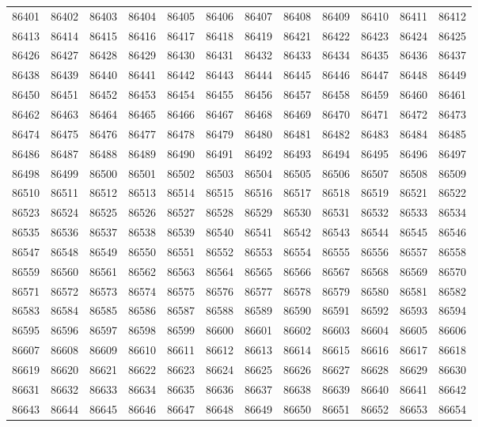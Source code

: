 \begin{center}
\begin{longtable}{llllllllllll}
86401 &86402 &86403 &86404 &86405 &86406 &86407 &86408 &86409 &86410 &86411 &86412 \\
86413 &86414 &86415 &86416 &86417 &86418 &86419 &86421 &86422 &86423 &86424 &86425 \\
86426 &86427 &86428 &86429 &86430 &86431 &86432 &86433 &86434 &86435 &86436 &86437 \\
86438 &86439 &86440 &86441 &86442 &86443 &86444 &86445 &86446 &86447 &86448 &86449 \\
86450 &86451 &86452 &86453 &86454 &86455 &86456 &86457 &86458 &86459 &86460 &86461 \\
86462 &86463 &86464 &86465 &86466 &86467 &86468 &86469 &86470 &86471 &86472 &86473 \\
86474 &86475 &86476 &86477 &86478 &86479 &86480 &86481 &86482 &86483 &86484 &86485 \\
86486 &86487 &86488 &86489 &86490 &86491 &86492 &86493 &86494 &86495 &86496 &86497 \\
86498 &86499 &86500 &86501 &86502 &86503 &86504 &86505 &86506 &86507 &86508 &86509 \\
86510 &86511 &86512 &86513 &86514 &86515 &86516 &86517 &86518 &86519 &86521 &86522 \\
86523 &86524 &86525 &86526 &86527 &86528 &86529 &86530 &86531 &86532 &86533 &86534 \\
86535 &86536 &86537 &86538 &86539 &86540 &86541 &86542 &86543 &86544 &86545 &86546 \\
86547 &86548 &86549 &86550 &86551 &86552 &86553 &86554 &86555 &86556 &86557 &86558 \\
86559 &86560 &86561 &86562 &86563 &86564 &86565 &86566 &86567 &86568 &86569 &86570 \\
86571 &86572 &86573 &86574 &86575 &86576 &86577 &86578 &86579 &86580 &86581 &86582 \\
86583 &86584 &86585 &86586 &86587 &86588 &86589 &86590 &86591 &86592 &86593 &86594 \\
86595 &86596 &86597 &86598 &86599 &86600 &86601 &86602 &86603 &86604 &86605 &86606 \\
86607 &86608 &86609 &86610 &86611 &86612 &86613 &86614 &86615 &86616 &86617 &86618 \\
86619 &86620 &86621 &86622 &86623 &86624 &86625 &86626 &86627 &86628 &86629 &86630 \\
86631 &86632 &86633 &86634 &86635 &86636 &86637 &86638 &86639 &86640 &86641 &86642 \\
86643 &86644 &86645 &86646 &86647 &86648 &86649 &86650 &86651 &86652 &86653 &86654 \\

\end{longtable}
\end{center}
